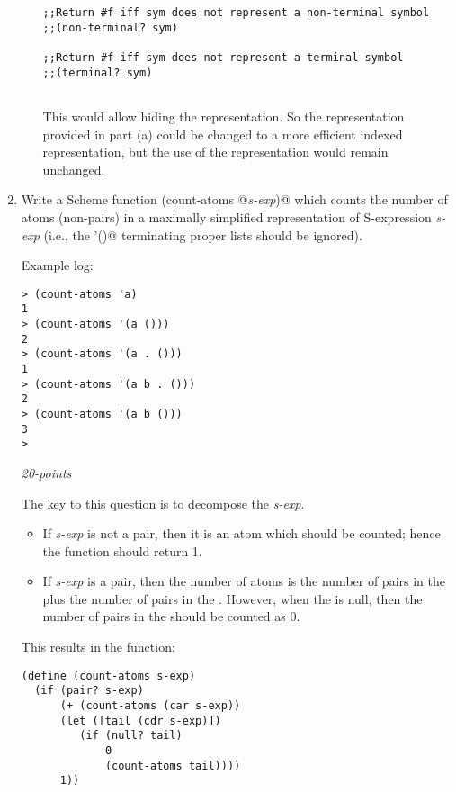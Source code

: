 \documentclass[12pt]{article}
\begin{document}
\begin{enumerate}
\begin{enumerate}
\begin{verbatim}
;;Return #f iff sym does not represent a non-terminal symbol  
;;(non-terminal? sym)  
  
;;Return #f iff sym does not represent a terminal symbol  
;;(terminal? sym)  
  
\end{verbatim}

This would allow hiding the representation.  So the representation
provided in part (a) could be changed to a more efficient indexed
representation, but the use of the representation would remain
unchanged. 

\end{enumerate}

\item Write a Scheme function
  \verb@(count-atoms @\textit{s-exp}\verb@)@ which counts the number
  of atoms (non-pairs) in a maximally simplified representation of
  S-expression \textit{s-exp} (i.e., the \verb@'()@ terminating proper
  lists should be ignored).

Example log:
\begin{verbatim}
> (count-atoms 'a)
1
> (count-atoms '(a ()))
2
> (count-atoms '(a . ()))
1
> (count-atoms '(a b . ()))
2
> (count-atoms '(a b ()))
3
>
\end{verbatim}  \hfill\textit{20-points}

The key to this question is to decompose the \textit{s-exp}.

\begin{itemize}

\item If \textit{s-exp} is not a pair, then it is an atom
  which should be counted; hence the function should return 1.

\item If \textit{s-exp} is a pair, then the number of atoms
  is the number of pairs in the \verb@car@ plus the number
  of pairs in the \verb@cdr@.  However, when the \verb@cdr@
  is null, then the number of pairs in the \verb@cdr@ should
  be counted as 0.
  
\end{itemize}

This results in the function:

\begin{verbatim}
(define (count-atoms s-exp)
  (if (pair? s-exp)
      (+ (count-atoms (car s-exp))
      (let ([tail (cdr s-exp)])
         (if (null? tail)
             0
             (count-atoms tail))))
      1))
\end{verbatim}


\end{enumerate}
\end{document}
